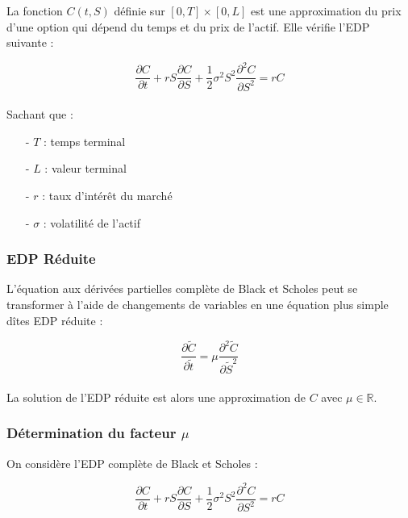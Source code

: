 \documentclass[11pt,a4paper]{article}
\begin{document}
\noindent
La fonction $C(t,S)$ définie sur $[0,T] \times [0,L]$ est une approximation du prix d'une option qui dépend du temps et du prix de l'actif. Elle vérifie l'EDP suivante :

\begin{equation} \label{eq:EDP_complete}
    \frac{\partial C}{\partial t} + r S \frac{\partial C}{\partial S} + \frac{1}{2} \sigma^2 S^2 \frac{\partial^2 C}{\partial S^2} = r C
\end{equation}\\

Sachant que :\\

\begin{itemize}
    \item[-] $T$ : temps terminal
    \item[-] $L$ : valeur terminal
    \item[-] $r$ : taux d'intérêt du marché
    \item[-] $\sigma$ : volatilité de l'actif
\end{itemize}

\subsubsection{EDP Réduite}

\noindent
L'équation aux dérivées partielles complète de Black et Scholes peut se transformer à l'aide de changements de variables en une équation plus simple dîtes EDP réduite :

\begin{equation} \label{eq:EDP_reduite}
     \frac{\partial \widetilde{C}}{\partial \widetilde{t}} = \mu \frac{\partial^{2} \widetilde{C}}{\partial \widetilde{S}^{2}} 
\end{equation}\\

La solution de l'EDP réduite est alors une approximation de $C$ avec $\mu \in \mathbb{R}$.

\newpage

\subsubsection{Détermination du facteur $\mu$}

On considère l'EDP complète de Black et Scholes :

$$\frac{\partial C}{\partial t} + r S \frac{\partial C}{\partial S} + \frac{1}{2} \sigma^2 S^2 \frac{\partial^2 C}{\partial S^2} = r C$$
\end{document}
